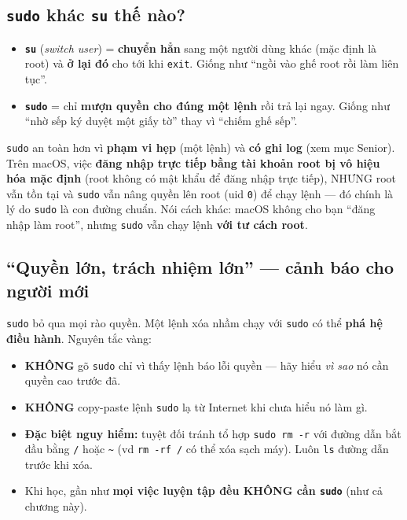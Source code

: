 \documentclass[12pt,a4paper]{article}
\newcommand{\cmd}[1]{\texttt{#1}}
\begin{document}
\subsection{\texttt{sudo} khác \texttt{su} thế nào?}

\begin{itemize}
\item \textbf{\cmd{su}} (\textit{switch user}) = \textbf{chuyển hẳn} sang một người
  dùng khác (mặc định là root) và \textbf{ở lại đó} cho tới khi \cmd{exit}. Giống như
  ``ngồi vào ghế root rồi làm liên tục''.
\item \textbf{\cmd{sudo}} = chỉ \textbf{mượn quyền cho đúng một lệnh} rồi trả lại
  ngay. Giống như ``nhờ sếp ký duyệt một giấy tờ'' thay vì ``chiếm ghế sếp''.
\end{itemize}

\cmd{sudo} an toàn hơn vì \textbf{phạm vi hẹp} (một lệnh) và \textbf{có ghi log} (xem
mục Senior). Trên macOS, việc \textbf{đăng nhập trực tiếp bằng tài khoản root bị vô
hiệu hóa mặc định} (root không có mật khẩu để đăng nhập trực tiếp), NHƯNG root vẫn
tồn tại và \cmd{sudo} vẫn nâng quyền lên root (uid \cmd{0}) để chạy lệnh --- đó chính
là lý do \cmd{sudo} là con đường chuẩn. Nói cách khác: macOS không cho bạn ``đăng
nhập làm root'', nhưng \cmd{sudo} vẫn chạy lệnh \textbf{với tư cách root}.

\subsection{``Quyền lớn, trách nhiệm lớn'' --- cảnh báo cho người mới}

\cmd{sudo} bỏ qua mọi rào quyền. Một lệnh xóa nhầm chạy với \cmd{sudo} có thể
\textbf{phá hệ điều hành}. Nguyên tắc vàng:

\begin{warnbox}
\begin{itemize}
\item \textbf{KHÔNG} gõ \cmd{sudo} chỉ vì thấy lệnh báo lỗi quyền --- hãy hiểu
  \textit{vì sao} nó cần quyền cao trước đã.
\item \textbf{KHÔNG} copy-paste lệnh \cmd{sudo} lạ từ Internet khi chưa hiểu nó làm
  gì.
\item \textbf{Đặc biệt nguy hiểm:} tuyệt đối tránh tổ hợp \cmd{sudo rm -r} với đường
  dẫn bắt đầu bằng \cmd{/} hoặc \cmd{\textasciitilde} (vd \cmd{rm -rf /} có thể xóa
  sạch máy). Luôn \cmd{ls} đường dẫn trước khi xóa.
\item Khi học, gần như \textbf{mọi việc luyện tập đều KHÔNG cần \cmd{sudo}} (như cả
  chương này).
\end{itemize}
\end{warnbox}
\end{document}
